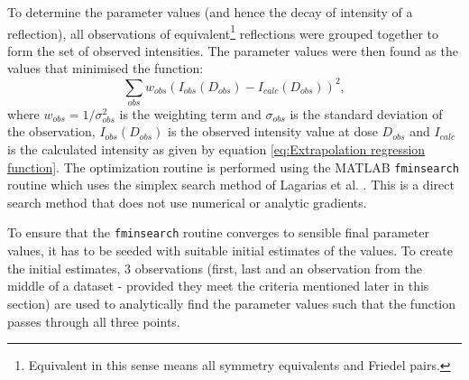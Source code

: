 To determine the parameter values (and hence the decay of intensity of a reflection), all observations of equivalent\footnote{Equivalent in this sense means all symmetry equivalents and Friedel pairs.} reflections were grouped together to form the set of observed intensities.
The parameter values were then found as the values that minimised the function:
\begin{equation}
\sum_{obs} w_{obs}\left(I_{obs}(D_{obs}) - I_{calc}(D_{obs}) \right)^2,
\label{eq:Extrapolation objective function}
\end{equation}
where $w_{obs} = 1/\sigma_{obs}^2$ is the weighting term and $\sigma_{obs}$ is the standard deviation of the observation, $I_{obs}(D_{obs})$ is the observed intensity value at dose $D_{obs}$ and $I_{calc}$ is the calculated intensity as given by equation \ref{eq:Extrapolation regression function}.
The optimization routine is performed using the MATLAB \verb|fminsearch| routine which uses the simplex search method of Lagarias et al. \cite{lagarias1998convergence}.
This is a direct search method that does not use numerical or analytic gradients.

To ensure that the \verb|fminsearch| routine converges to sensible final parameter values, it has to be seeded with suitable initial estimates of the values. To create the initial estimates, 3 observations (first, last and an observation from the middle of a dataset - provided they meet the criteria mentioned later in this section) are used to analytically find the parameter values such that the function passes through all three points.

